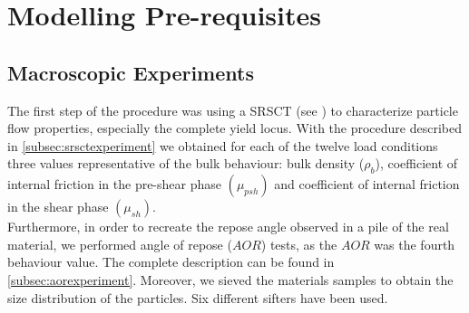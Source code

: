 \section{Modelling Pre-requisites}
\label{sec:modellingprerequisites}


\subsection{Macroscopic Experiments}
\label{subsec:Macroscopicexperiments}

The first step of the procedure was using a SRSCT (see \cite{RefWorks:142}) to characterize particle flow properties, 
especially the complete yield locus.
With the procedure described in \ref{subsec:srsctexperiment} we
obtained for each of the twelve load conditions three values representative of the bulk behaviour: bulk density ($\rho_b$),
coefficient of internal friction in the pre-shear phase $ (\mu_{psh})$ and
coefficient of internal friction in the shear phase  $ (\mu_{sh})$.\\
Furthermore, in order to recreate the repose angle observed in a pile of the real material, 
we performed angle of repose ($AOR$) tests, as the $AOR$ was the fourth
behaviour value. The complete description can be found in
\ref{subsec:aorexperiment}.
Moreover, we sieved the materials samples to obtain the size distribution of the
particles. Six different sifters have been used.\\

